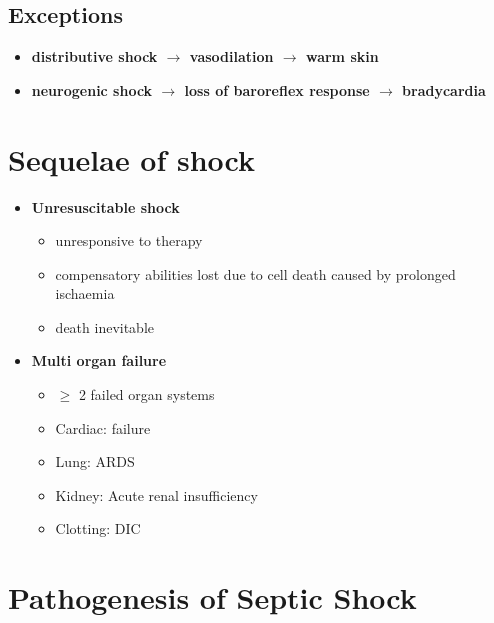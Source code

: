 \documentclass[
  12pt,
]{memoir}
\providecommand{\tightlist}{%
  \setlength{\itemsep}{0pt}\setlength{\parskip}{0pt}}
\begin{document}
\hypertarget{exceptions}{%
\subsection{Exceptions}\label{exceptions}}

\begin{itemize}
\tightlist
\item
  \textbf{distributive shock \(\rightarrow\) vasodilation
  \(\rightarrow\) warm skin}
\item
  \textbf{neurogenic shock \(\rightarrow\) loss of baroreflex response
  \(\rightarrow\) bradycardia}
\end{itemize}

\hypertarget{sequelae-of-shock}{%
\section{Sequelae of shock}\label{sequelae-of-shock}}

\begin{itemize}
\tightlist
\item
  \textbf{Unresuscitable shock}

  \begin{itemize}
  \tightlist
  \item
    unresponsive to therapy
  \item
    compensatory abilities lost due to cell death caused by prolonged
    ischaemia
  \item
    death inevitable
  \end{itemize}
\item
  \textbf{Multi organ failure}

  \begin{itemize}
  \tightlist
  \item
    \(\ge\) 2 failed organ systems
  \item
    Cardiac: failure
  \item
    Lung: ARDS
  \item
    Kidney: Acute renal insufficiency
  \item
    Clotting: DIC
  \end{itemize}
\end{itemize}

\pagebreak

\hypertarget{pathogenesis-of-septic-shock}{%
\section{Pathogenesis of Septic
Shock}\label{pathogenesis-of-septic-shock}}
\end{document}
